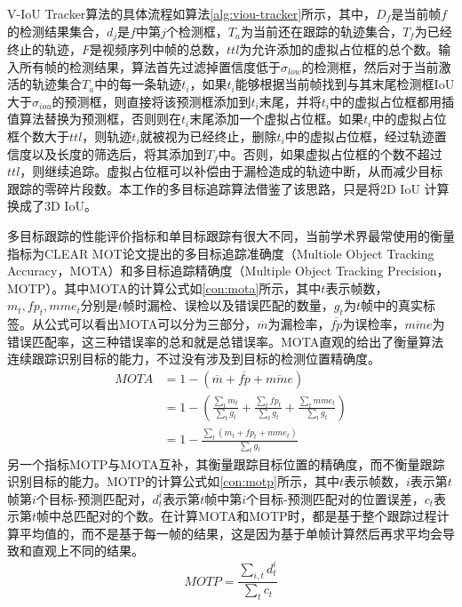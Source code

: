 V-IoU Tracker算法的具体流程如算法\ref{alg:viou-tracker}所示，其中，$D_f$是当前帧$f$的检测结果集合，$d_j$是$f$中第$j$个检测框，$T_a$为当前还在跟踪的轨迹集合，$T_f$为已经终止的轨迹，$F$是视频序列中帧的总数，$ttl$为允许添加的虚拟占位框的总个数。输入所有帧的检测结果，算法首先过滤掉置信度低于$\sigma_{low}$的检测框，然后对于当前激活的轨迹集合$T_a$中的每一条轨迹$t_i$，如果$t_i$能够根据当前帧找到与其末尾检测框IoU大于$\sigma_{iou}$的预测框，则直接将该预测框添加到$t_i$末尾，并将$t_i$中的虚拟占位框都用插值算法替换为预测框，否则则在$t_i$末尾添加一个虚拟占位框。如果$t_i$中的虚拟占位框个数大于$ttl$，则轨迹$t_i$就被视为已经终止，删除$t_i$中的虚拟占位框，经过轨迹置信度以及长度的筛选后，将其添加到$T_f$中。否则，如果虚拟占位框的个数不超过$ttl$，则继续追踪。虚拟占位框可以补偿由于漏检造成的轨迹中断，从而减少目标跟踪的零碎片段数。本工作的多目标追踪算法借鉴了该思路，只是将2D IoU 计算换成了3D IoU。


多目标跟踪的性能评价指标和单目标跟踪有很大不同，当前学术界最常使用的衡量指标为CLEAR MOT\cite{bernardin2008evaluating}论文提出的多目标追踪准确度（Multiole Object Tracking Accuracy，MOTA）和多目标追踪精确度（Multiple Object Tracking Precision，MOTP）。其中MOTA的计算公式如\ref{con:mota}所示，其中$t$表示帧数，$m_t, fp_t, mme_t$分别是$t$帧时漏检、误检以及错误匹配的数量，$g_t$为$t$帧中的真实标签。从公式可以看出MOTA可以分为三部分，$\overline{m}$为漏检率，$\overline{fp}$为误检率，$\overline{mme}$为错误匹配率，这三种错误率的总和就是总错误率。MOTA直观的给出了衡量算法连续跟踪识别目标的能力，不过没有涉及到目标的检测位置精确度。
\begin{equation}
\begin{split}
MOTA & = 1 - (\overline{m} + \overline{fp} + \overline{mme})\\
& = 1 - \left(\frac{\sum_t m_t}{\sum_t g_t} + \frac{\sum_t fp_t}{\sum_t g_t} + \frac{\sum_t mme_t}{\sum_t g_t} \right)\\
& = 1 - \frac{\sum_t (m_t + fp_t + mme_t)}{\sum_t g_t}
\end{split}
\label{con:mota}
\end{equation}
另一个指标MOTP与MOTA互补，其衡量跟踪目标位置的精确度，而不衡量跟踪识别目标的能力。MOTP的计算公式如\ref{con:motp}所示，其中$t$表示帧数，$i$表示第$t$帧第$i$个目标-预测匹配对，$d^i_t$表示第$t$帧中第$i$个目标-预测匹配对的位置误差，$c_t$表示第$t$帧中总匹配对的个数。在计算MOTA和MOTP时，都是基于整个跟踪过程计算平均值的，而不是基于每一帧的结果，这是因为基于单帧计算然后再求平均会导致和直观上不同的结果。
\begin{equation}
MOTP = \frac{\sum_{i,t} d^i_t}{\sum_t c_t}
\label{con:motp}
\end{equation}

